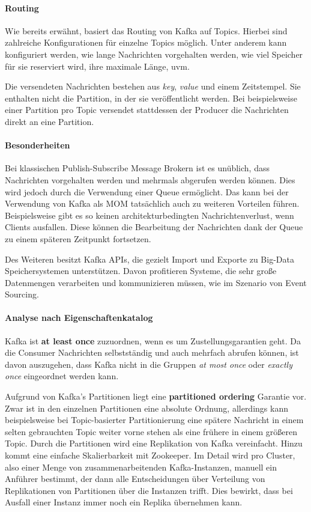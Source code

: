 \paragraph{Routing}
Wie bereits erwähnt, basiert das Routing von Kafka auf Topics. Hierbei sind
zahlreiche Konfigurationen für einzelne Topics möglich.
Unter anderem kann konfiguriert werden, wie lange Nachrichten vorgehalten
werden, wie viel Speicher für sie reserviert wird, ihre maximale Länge, uvm.

Die versendeten Nach\-rich\-ten bestehen aus \textit{key}, \textit{value} und einem
Zeitstempel. Sie enthalten nicht die Partition, in der sie veröffentlicht werden.
Bei beispielsweise einer Partition pro Topic versendet stattdessen der Producer
die Nachrichten direkt an eine Partition.
\paragraph{Besonderheiten}
Bei klassischen Publish-Subscribe Message Brokern ist es unüblich, dass
Nach\-rich\-ten vorgehalten werden und mehrmals abgerufen werden können. Dies
wird jedoch durch die Verwendung einer Queue ermöglicht. Das kann bei der
Verwendung von Kafka als MOM tatsächlich auch zu weiteren Vorteilen führen.
Beispielsweise gibt es so keinen architekturbedingten Nachrichtenverlust, wenn Clients
ausfallen. Diese können die Bearbeitung der Nachrichten dank der Queue zu einem
späteren Zeitpunkt fortsetzen.

Des Weiteren besitzt Kafka APIs, die gezielt Import und Exporte zu Big-Data
Speichersystemen unterstützen. Davon profitieren Systeme, die sehr große Datenmengen
verarbeiten und kommunizieren müssen, wie im Szenario von Event Sourcing.

\paragraph{Analyse nach Eigenschaftenkatalog}
Kafka ist \textbf{at least once} zuzuordnen, wenn es um
Zustellungsgarantien geht. Da die Consumer Nachrichten selbstständig und auch
mehrfach abrufen können, ist davon auszugehen, dass Kafka nicht in die Gruppen
\textit{at most once} oder \textit{exactly once} eingeordnet werden kann. \cite{ApacheKa84:online}

Aufgrund von Kafka's Partitionen liegt eine \textbf{partitioned ordering}
Garantie vor. Zwar ist in den einzelnen Partitionen eine absolute Ordnung, allerdings
kann beispielsweise bei Topic-basierter Partitionierung eine spätere Nachricht
in einem selten gebrauchten Topic weiter vorne stehen als eine frühere in einem
größeren Topic.
Durch die Partitionen wird eine Replikation von Kafka vereinfacht. Hinzu kommt
eine einfache Skalierbarkeit mit Zookeeper. Im Detail wird
pro Cluster, also einer Menge von zusammenarbeitenden Kafka-Instanzen, manuell ein
Anführer bestimmt, der dann alle Entscheidungen über Verteilung von Replikationen
von Partitionen über die Instanzen trifft. Dies bewirkt, dass bei Ausfall einer
Instanz immer noch ein Replika übernehmen kann. \cite{ApacheKa84:online}

